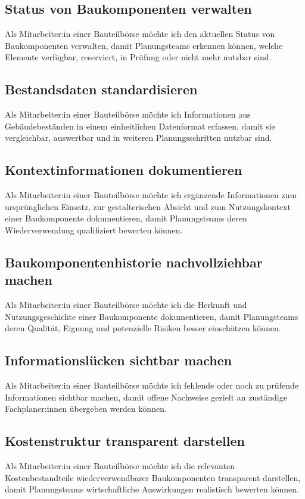 \subsection{Status von Baukomponenten verwalten}
\label{us:bb-04} Als Mitarbeiter:in einer Bauteilbörse möchte ich den aktuellen Status von Baukomponenten verwalten, damit Planungsteams erkennen können, welche Elemente verfügbar, reserviert, in Prüfung oder nicht mehr nutzbar sind.

\subsection{Bestandsdaten standardisieren}
\label{us:bb-05} Als Mitarbeiter:in einer Bauteilbörse möchte ich Informationen aus Gebäudebeständen in einem einheitlichen Datenformat erfassen, damit sie vergleichbar, auswertbar und in weiteren Planungsschritten nutzbar sind.

\subsection{Kontextinformationen dokumentieren}
\label{us:bb-06} Als Mitarbeiter:in einer Bauteilbörse möchte ich ergänzende Informationen zum ursprünglichen Einsatz, zur gestalterischen Absicht und zum Nutzungskontext einer Baukomponente dokumentieren, damit Planungsteams deren Wiederverwendung qualifiziert bewerten können.

\subsection{Baukomponentenhistorie nachvollziehbar machen}
\label{us:bb-07} Als Mitarbeiter:in einer Bauteilbörse möchte ich die Herkunft und Nutzungsgeschichte einer Baukomponente dokumentieren, damit Planungsteams deren Qualität, Eignung und potenzielle Risiken besser einschätzen können.

\subsection{Informationslücken sichtbar machen}
\label{us:bb-08} Als Mitarbeiter:in einer Bauteilbörse möchte ich fehlende oder noch zu prüfende Informationen sichtbar machen, damit offene Nachweise gezielt an zuständige Fachplaner:innen übergeben werden können.

\subsection{Kostenstruktur transparent darstellen}
\label{us:bb-09} Als Mitarbeiter:in einer Bauteilbörse möchte ich die relevanten Kostenbestandteile wiederverwendbarer Baukomponenten transparent darstellen, damit Planungsteams wirtschaftliche Auswirkungen realistisch bewerten können.

